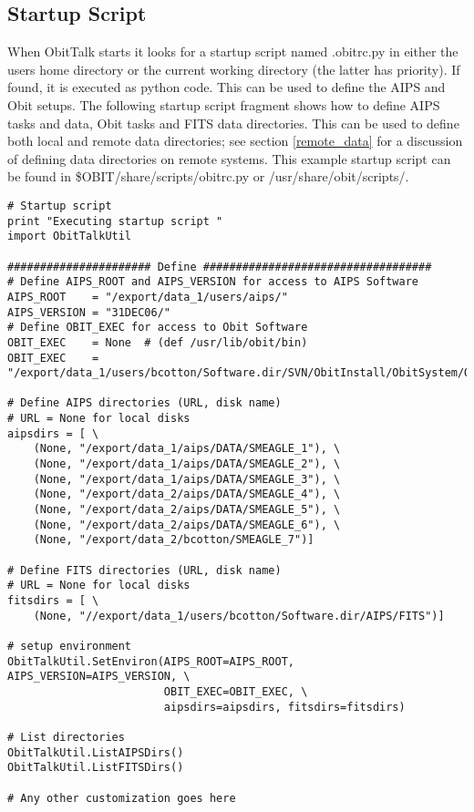 \documentclass[11pt]{report}
\begin{document}
\subsection{Startup Script}
When ObitTalk starts it looks for a startup script named .obitrc.py in
either the users home directory or the current working directory (the
latter has priority).
If found, it is executed as python code.
This can be used to define the AIPS and Obit setups.
The following startup script fragment shows how to define AIPS tasks
and data, Obit tasks and FITS data directories.
This can be used to define both local and remote data directories; see
section \ref{remote_data} for a discussion of defining data
directories on remote systems.
This example startup script can be found in
\$OBIT/share/scripts/obitrc.py or /usr/share/obit/scripts/.
\begin{verbatim}
# Startup script
print "Executing startup script "
import ObitTalkUtil

###################### Define ###################################
# Define AIPS_ROOT and AIPS_VERSION for access to AIPS Software
AIPS_ROOT    = "/export/data_1/users/aips/"
AIPS_VERSION = "31DEC06/"
# Define OBIT_EXEC for access to Obit Software 
OBIT_EXEC    = None  # (def /usr/lib/obit/bin)
OBIT_EXEC    = "/export/data_1/users/bcotton/Software.dir/SVN/ObitInstall/ObitSystem/Obit/"

# Define AIPS directories (URL, disk name)
# URL = None for local disks
aipsdirs = [ \
    (None, "/export/data_1/aips/DATA/SMEAGLE_1"), \
    (None, "/export/data_1/aips/DATA/SMEAGLE_2"), \
    (None, "/export/data_1/aips/DATA/SMEAGLE_3"), \
    (None, "/export/data_2/aips/DATA/SMEAGLE_4"), \
    (None, "/export/data_2/aips/DATA/SMEAGLE_5"), \
    (None, "/export/data_2/aips/DATA/SMEAGLE_6"), \
    (None, "/export/data_2/bcotton/SMEAGLE_7")]

# Define FITS directories (URL, disk name)
# URL = None for local disks
fitsdirs = [ \
    (None, "//export/data_1/users/bcotton/Software.dir/AIPS/FITS")]

# setup environment
ObitTalkUtil.SetEnviron(AIPS_ROOT=AIPS_ROOT, AIPS_VERSION=AIPS_VERSION, \
                        OBIT_EXEC=OBIT_EXEC, \
                        aipsdirs=aipsdirs, fitsdirs=fitsdirs)

# List directories
ObitTalkUtil.ListAIPSDirs()
ObitTalkUtil.ListFITSDirs()

# Any other customization goes here
\end{verbatim}
\end{document}
